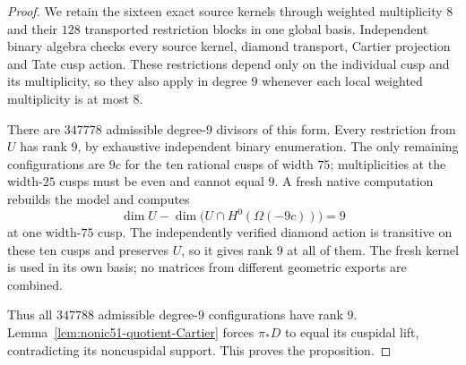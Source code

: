 \begin{proof}
We retain the sixteen exact source kernels through weighted
multiplicity $8$ and their $128$ transported restriction blocks in
one global basis. Independent binary algebra checks every source
kernel, diamond transport, Cartier projection and Tate cusp action.
These restrictions depend only on the individual cusp and its
multiplicity, so they also apply in degree $9$ whenever each local
weighted multiplicity is at most $8$.

There are $347778$ admissible degree-$9$ divisors of this form.
Every restriction from $U$ has rank $9$, by exhaustive independent
binary enumeration. The only remaining configurations are $9c$
for the ten rational cusps of width $75$; multiplicities at the
width-$25$ cusps must be even and cannot equal $9$.
A fresh native computation rebuilds the model and computes
\[
 \dim U-\dim\bigl(U\cap H^0(\Omega(-9c))\bigr)=9
\]
at one width-$75$ cusp. The independently verified diamond action
is transitive on these ten cusps and preserves $U$, so it gives rank
$9$ at all of them. The fresh kernel is used in its own basis;
no matrices from different geometric exports are combined.

Thus all $347788$ admissible degree-$9$ configurations have rank $9$.
Lemma~\ref{lem:nonic51-quotient-Cartier} forces $\pi_*D$ to equal
its cuspidal lift, contradicting its noncuspidal support.
This proves the proposition.
\end{proof}

